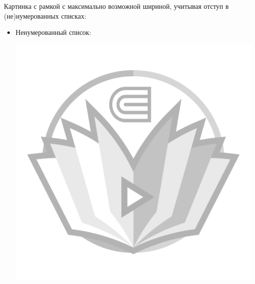 Картинка с рамкой с максимально возможной шириной, учитывая отступ в (не)нумерованных списках:
\begin{itemize}
  \item Ненумерованный список:
        \begin{center}
          \begin{minipage}[c]{\textwidth - \fboxaddlen - \itemparindent}
            \centering
            \includegraphics[width={\textwidth - \fboxaddlen - \itemparindent},fbox]{Images/watermark.png}
          \end{minipage}
        \end{center}

\end{itemize}

